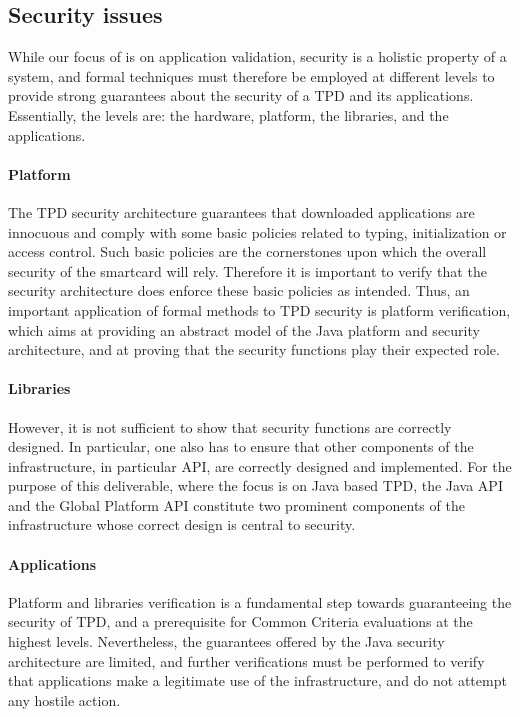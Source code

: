 \subsection{Security issues}
While our focus of is on application validation,
security is a holistic property of a system, and formal techniques
must therefore be employed at different levels to provide strong
guarantees about the security of a TPD and its applications.
Essentially, the levels are: the hardware, platform, the libraries,
and the applications.

\paragraph*{Platform} The TPD security architecture guarantees that
downloaded applications are innocuous and comply with some basic
policies related to typing, initialization or access control. Such
basic policies are the cornerstones upon which the overall security of
the smartcard will rely. Therefore it is important to verify that the
security architecture does enforce these basic policies as
intended. Thus, an important application of formal methods to TPD
security is platform verification, which aims at providing an abstract
model of the Java platform and security architecture, and at proving
that the security functions play their expected role.

\paragraph*{Libraries} However, it is not sufficient to show that
security functions are correctly designed. In particular, one also has
to ensure that other components of the infrastructure, in particular
API, are correctly designed and implemented. For the purpose of this
deliverable, where the focus is on Java based TPD, the Java API and
the Global Platform API constitute two prominent components of the
infrastructure whose correct design is central to security. 


\paragraph*{Applications} 
Platform and libraries verification is a fundamental step towards
guaranteeing the security of TPD, and a prerequisite for Common
Criteria evaluations at the highest levels. Nevertheless, the
guarantees offered by the Java security architecture are limited, and
further verifications must be performed to verify that applications
make a legitimate use of the infrastructure, and do not attempt any
hostile action.

